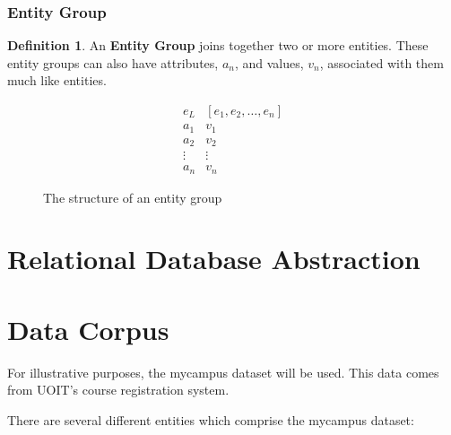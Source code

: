 \documentclass[12pt,letterpaper,oneside,notitlepage]{report}
\theoremstyle{definition}
\newtheorem{defn}{Definition}
\begin{document}
				\subsubsection{Entity Group}
					\begin{defn}
						An \textbf{Entity Group} joins together two or more entities.  These entity groups can also have attributes, $a_n$, and values, $v_n$, associated with them much like entities.

						\begin{figure}[!ht]
							\centering
							\[
								\begin{array}{ll}
									e_L & \left[ e_1, e_2, \ldots, e_n \right] \\
									a_1 & v_1 \\
									a_2 & v_2 \\
									\vdots & \vdots \\
									a_n & v_n
								\end{array}
							\]
							\caption{The structure of an entity group}
							\label{fig:entity-group-rep}
						\end{figure}

%
%							
%
					\end{defn}
					
		\section{Relational Database Abstraction}
		\label{sec:database-abstraction}
		
		\section{Data Corpus}
		\label{sec:data-corpus}
			For illustrative purposes, the mycampus dataset will be used.  This data comes from UOIT's course registration system.
			
			There are several different entities which comprise the mycampus dataset:
			
\end{document}
